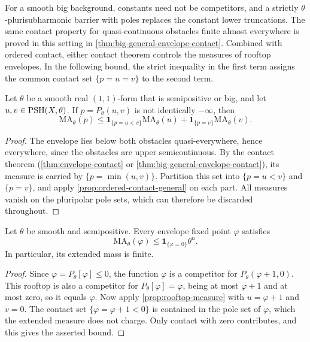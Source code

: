 For a smooth big background, constants need not be competitors, and a strictly $\theta$-plurisubharmonic barrier with poles replaces the constant lower truncations. The same contact property for quasi-continuous obstacles finite almost everywhere is proved in this setting in \cref{thm:big-general-envelope-contact}. Combined with ordered contact, either contact theorem controls the measures of rooftop envelopes. In the following bound, the strict inequality in the first term assigns the common contact set $\{p=u=v\}$ to the second term.

\begin{proposition}\label{prop:rooftop-measure}
Let $\theta$ be a smooth real $(1,1)$-form that is semipositive or big, and let $u,v\in\mathrm{PSH}(X,\theta)$. If $p=P_\theta(u,v)$ is not identically $-\infty$, then
\[
 \mathrm{MA}_\theta(p)
 \leq\mathbf1_{\{p=u<v\}}\mathrm{MA}_\theta(u)
      +\mathbf1_{\{p=v\}}\mathrm{MA}_\theta(v).
\]
\end{proposition}
\begin{proof}
The envelope lies below both obstacles quasi-everywhere, hence everywhere, since the obstacles are upper semicontinuous. By the contact theorem (\cref{thm:envelope-contact} or \cref{thm:big-general-envelope-contact}), its measure is carried by $\{p=\min(u,v)\}$. Partition this set into $\{p=u<v\}$ and $\{p=v\}$, and apply \cref{prop:ordered-contact-general} on each part. All measures vanish on the pluripolar pole sets, which can therefore be discarded throughout.
\end{proof}

\begin{proposition}\label{prop:fixed-point-finite}
Let $\theta$ be smooth and semipositive. Every envelope fixed point $\varphi$ satisfies
\[
 \mathrm{MA}_\theta(\varphi)
 \leq\mathbf1_{\{\varphi=0\}}\theta^n.
\]
In particular, its extended mass is finite.
\end{proposition}
\begin{proof}
Since $\varphi=P_\theta[\varphi]\leq0$, the function $\varphi$ is a competitor for $P_\theta(\varphi+1,0)$. This rooftop is also a competitor for $P_\theta[\varphi]=\varphi$, being at most $\varphi+1$ and at most zero, so it equals $\varphi$. Now apply \cref{prop:rooftop-measure} with $u=\varphi+1$ and $v=0$. The contact set $\{\varphi=\varphi+1<0\}$ is contained in the pole set of $\varphi$, which the extended measure does not charge. Only contact with zero contributes, and this gives the asserted bound.
\end{proof}

